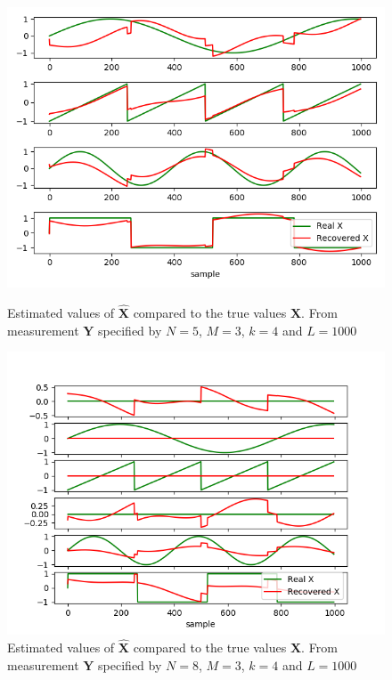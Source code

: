 \begin{figure}[H]
    \begin{minipage}[t]{.45\textwidth}
    	\centering
		\includegraphics[scale=0.45]{figures/ch_6/M-SBL_simple1.png}
		\caption{Estimated values of $\hat{\textbf{X}}$ compared to the true 					values $\textbf{X}$. From measurement $\textbf{Y}$ specified by $N=5$, $M = 3$, $k=4$ and $L=1000$}
		\label{fig:M-SBL_simple1}
    \end{minipage} 
    \hfill
    \begin{minipage}[t]{.45\textwidth}
        \centering
		\includegraphics[scale=0.5]{figures/ch_6/M-SBL_simple2.png}
		\caption{Estimated values of $\hat{\textbf{X}}$ compared to the true 				values $\textbf{X}$. From measurement $\textbf{Y}$ specified by $N=8$, $M = 3$, $k=4$ and $L=1000$ }
		\label{fig:M-SBL_simple2}
    \end{minipage}
\end{figure}
